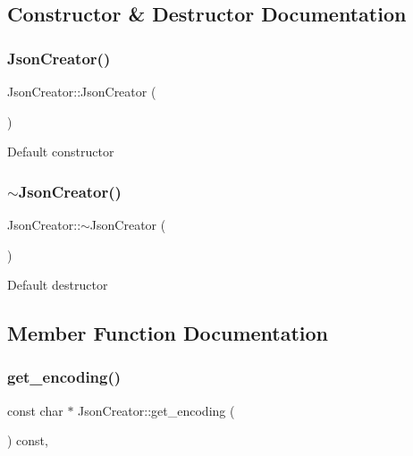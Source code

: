 \subsection{Constructor \& Destructor Documentation}
\mbox{\label{classJsonCreator_a71197e5dafee7dd9c04c208413050860}} 
\subsubsection{\texorpdfstring{Json\+Creator()}{JsonCreator()}}
{\footnotesize\ttfamily Json\+Creator\+::\+Json\+Creator (\begin{DoxyParamCaption}{ }\end{DoxyParamCaption})\hspace{0.3cm}{\ttfamily [default]}}

Default constructor \mbox{\label{classJsonCreator_a061eaa469894ab51ae6c046016da9e40}} 
\subsubsection{\texorpdfstring{$\sim$\+Json\+Creator()}{~JsonCreator()}}
{\footnotesize\ttfamily Json\+Creator\+::$\sim$\+Json\+Creator (\begin{DoxyParamCaption}{ }\end{DoxyParamCaption})\hspace{0.3cm}{\ttfamily [default]}}

Default destructor 

\subsection{Member Function Documentation}
\mbox{\label{classJsonCreator_ab7313de0040d40a26a9386eb3714120c}} 
\subsubsection{\texorpdfstring{get\+\_\+encoding()}{get\_encoding()}}
{\footnotesize\ttfamily const char $\ast$ Json\+Creator\+::get\+\_\+encoding (\begin{DoxyParamCaption}{ }\end{DoxyParamCaption}) const\hspace{0.3cm}{\ttfamily [override]}, {\ttfamily [virtual]}}


